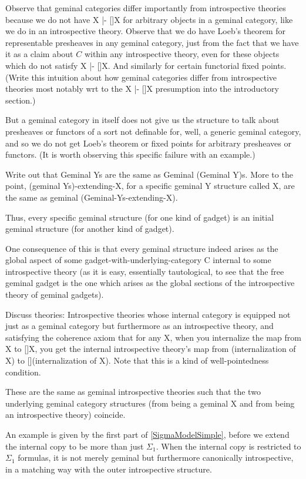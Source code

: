 \begin{TODOblock}
Observe that geminal categories differ importantly from introspective theories because we do not have X |- []X for arbitrary objects in a geminal category, like we do in an introspective theory. Observe that we do have Loeb's theorem for representable presheaves in any geminal category, just from the fact that we have it as a claim about $C$ within any introspective theory, even for these objects which do not satisfy X |- []X. And similarly for certain functorial fixed points. (Write this intuition about how geminal categories differ from introspective theories most notably wrt to the X |- []X presumption into the introductory section.)

But a geminal category in itself does not give us the structure to talk about presheaves or functors of a sort not definable for, well, a generic geminal category, and so we do not get Loeb's theorem or fixed points for arbitrary presheaves or functors. (It is worth observing this specific failure with an example.)
\end{TODOblock}

\begin{TODOblock}
Write out that Geminal Ys are the same as Geminal (Geminal Y)s. More to the point, (geminal Ys)-extending-X, for a specific geminal Y structure called X, are the same as geminal (Geminal-Ys-extending-X).

Thus, every specific geminal structure (for one kind of gadget) is an initial geminal structure (for another kind of gadget).

One consequence of this is that every geminal structure indeed arises as the global aspect of some gadget-with-underlying-category C internal to some introspective theory (as it is easy, essentially tautological, to see that the free geminal gadget is the one which arises as the global sections of the introspective theory of geminal gadgets).
\end{TODOblock}

\begin{TODOblock}
Discuss  theories: Introspective theories whose internal category is equipped not just as a geminal category but furthermore as an introspective theory, and satisfying the coherence axiom that for any X, when you internalize the map from X to []X, you get the internal introspective theory's map from (internalization of X) to [](internalization of X). Note that this is a kind of well-pointedness condition.

These are the same as geminal introspective theories such that the two underlying geminal category structures (from being a geminal X and from being an introspective theory) coincide.

An example is given by the first part of \cref{SigmaModelSimple}, before we extend the internal copy to be more than just $\Sigma_1$. When the internal copy is restricted to $\Sigma_1$ formulas, it is not merely geminal but furthermore canonically introspective, in a matching way with the outer introspective structure.
\end{TODOblock}

